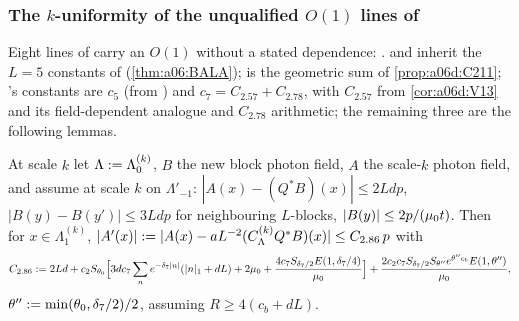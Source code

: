 
\subsubsection*{The $k$-uniformity of the unqualified $O(1)$ lines of \cite{Ba2}}

Eight lines of \cite{Ba2} carry an $O(1)$ without a stated dependence: \cite[(2.61), (2.86), (2.91), (2.94), (2.95), (2.103), (2.117), (2.118)]{Ba2}. \cite[(2.61)]{Ba2} and \cite[(2.95)]{Ba2} inherit the $L=5$ constants of \cite[Lemmas~2.3, 2.4]{Ba2} (\cref{thm:a06:BALA}); \cite[(2.118)]{Ba2} is the geometric sum of \cref{prop:a06d:C211}; \cite[(2.117)]{Ba2}'s constants are $c_5$ (from \cite[Prop.~3.1$'$]{Ba4}) and $c_7=C_{2.57}+C_{2.78}$, with $C_{2.57}$ from \cref{cor:a06d:V13} and its field-dependent analogue and $C_{2.78}$ arithmetic; the remaining three are the following lemmas.

\begin{lemma}\label{lem:a06d:C61}
At scale $k$ let $\Lambda:=\Lambda^{(k)}_0$, $B$ the new block photon field, $A$ the scale-$k$ photon field, and assume \cite[(2.17)]{Ba2} at scale $k$ on $\Lambda'_{-1}$: $|A(x)-(Q^*B)(x)|\le2Ldp$, $|B(y)-B(y')|\le3Ldp$ for neighbouring $L$-blocks, $|B(y)|\le2p/(\mu_0 t)$. Then for $x\in\Lambda^{(k)}_1$, $|A'(x)|:=|A(x)-aL^{-2}(C^{(k)}_\Lambda Q^*B)(x)|\le C_{2.86}\,p$ with
\[
C_{2.86}:=2Ld+c_2S_{\theta_0}\Big[3dc_7\sum_ne^{-\delta_7|n|}(|n|_1+dL)+2\mu_0+\frac{4c_7S_{\delta_7/2}E(1,\delta_7/4)}{\mu_0}\Big]+\frac{2c_2c_7S_{\delta_7/2}S_{\theta''}e^{\theta''c_b}E(1,\theta'')}{\mu_0},
\]
$\theta'':=\min(\theta_0,\delta_7/2)/2$, assuming $R\ge4(c_b+dL)$.
\end{lemma}

